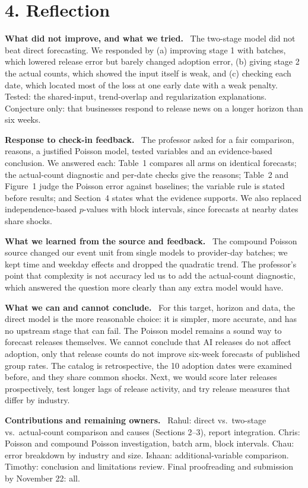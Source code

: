 \documentclass[10pt]{article}
\newcommand{\sub}[1]{\textbf{#1}\ }
\begin{document}
\section{4. Reflection}
\sub{What did not improve, and what we tried.} The two-stage model did not beat direct forecasting. We responded by (a) improving stage 1 with batches, which lowered release error but barely changed adoption error, (b) giving stage 2 the actual counts, which showed the input itself is weak, and (c) checking each date, which located most of the loss at one early date with a weak penalty. Tested: the shared-input, trend-overlap and regularization explanations. Conjecture only: that businesses respond to release news on a longer horizon than six weeks.

\sub{Response to check-in feedback.} The professor asked for a fair comparison, reasons, a justified Poisson model, tested variables and an evidence-based conclusion. We answered each: Table~1 compares all arms on identical forecasts; the actual-count diagnostic and per-date checks give the reasons; Table~2 and Figure~1 judge the Poisson error against baselines; the variable rule is stated before results; and Section~4 states what the evidence supports. We also replaced independence-based $p$-values with block intervals, since forecasts at nearby dates share shocks.

\sub{What we learned from the source and feedback.} The compound Poisson source changed our event unit from single models to provider-day batches; we kept time and weekday effects and dropped the quadratic trend. The professor's point that complexity is not accuracy led us to add the actual-count diagnostic, which answered the question more clearly than any extra model would have.

\sub{What we can and cannot conclude.} For this target, horizon and data, the direct model is the more reasonable choice: it is simpler, more accurate, and has no upstream stage that can fail. The Poisson model remains a sound way to forecast releases themselves. We cannot conclude that AI releases do not affect adoption, only that release counts do not improve six-week forecasts of published group rates. The catalog is retrospective, the 10 adoption dates were examined before, and they share common shocks. Next, we would score later releases prospectively, test longer lags of release activity, and try release measures that differ by industry.

\sub{Contributions and remaining owners.} Rahul: direct vs.\ two-stage vs.\ actual-count comparison and causes (Sections 2--3), report integration. Chris: Poisson and compound Poisson investigation, batch arm, block intervals. Chau: error breakdown by industry and size. Ishaan: additional-variable comparison. Timothy: conclusion and limitations review. Final proofreading and submission by November 22: all.
\end{document}
